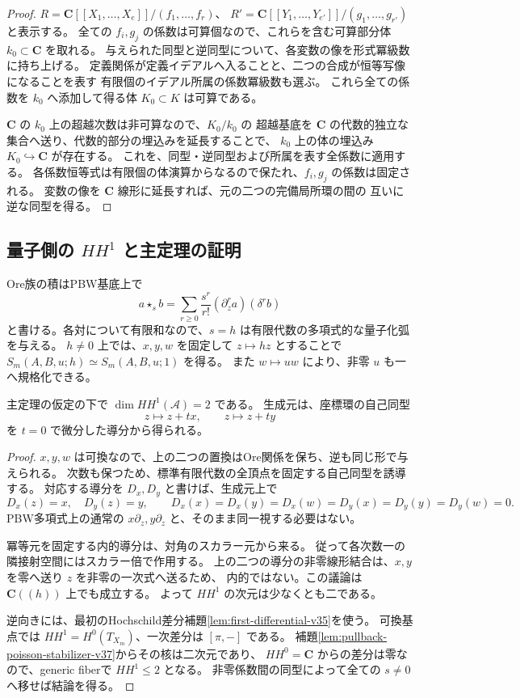 \begin{proof}
$R=\mathbf C[[X_1,\ldots,X_e]]/(f_1,\ldots,f_r)$、
$R'=\mathbf C[[Y_1,\ldots,Y_{e'}]]/(g_1,\ldots,g_{r'})$ と表示する。
全ての $f_i,g_j$ の係数は可算個なので、これらを含む可算部分体
$k_0\subset\mathbf C$ を取れる。
与えられた同型と逆同型について、各変数の像を形式冪級数に持ち上げる。
定義関係が定義イデアルへ入ることと、二つの合成が恒等写像になることを表す
有限個のイデアル所属の係数冪級数も選ぶ。
これら全ての係数を $k_0$ へ添加して得る体 $K_0\subset K$ は可算である。

$\mathbf C$ の $k_0$ 上の超越次数は非可算なので、$K_0/k_0$ の
超越基底を $\mathbf C$ の代数的独立な集合へ送り、代数的部分の埋込みを延長することで、
$k_0$ 上の体の埋込み $K_0\hookrightarrow\mathbf C$ が存在する。
これを、同型・逆同型および所属を表す全係数に適用する。
各係数恒等式は有限個の体演算からなるので保たれ、$f_i,g_j$ の係数は固定される。
変数の像を $\mathbf C$ 線形に延長すれば、元の二つの完備局所環の間の
互いに逆な同型を得る。
\end{proof}

\subsection{量子側の $HH^1$ と主定理の証明}

Ore族の積はPBW基底上で
\[
 a\star_s b=\sum_{r\ge0}\frac{s^r}{r!}
                  (\partial_z^r a)(\delta^r b)
\]
と書ける。各対について有限和なので、$s=h$ は有限代数の多項式的な量子化弧を与える。
$h\ne0$ 上では、$x,y,w$ を固定して $z\mapsto hz$ とすることで
$S_m(A,B,u;h)\simeq S_m(A,B,u;1)$ を得る。
また $w\mapsto uw$ により、非零 $u$ も一へ規格化できる。

\begin{lemma}[量子側の二つの外的導分]
\label{lem:pullback-quantum-HH1-v37}
主定理の仮定の下で $\dim HH^1(\mathcal A)=2$ である。
生成元は、座標環の自己同型
\[
 z\longmapsto z+tx,\qquad z\longmapsto z+ty
\]
を $t=0$ で微分した導分から得られる。
\end{lemma}

\begin{proof}
$x,y,w$ は可換なので、上の二つの置換はOre関係を保ち、逆も同じ形で与えられる。
次数も保つため、標準有限代数の全頂点を固定する自己同型を誘導する。
対応する導分を $D_x,D_y$ と書けば、生成元上で
\[
 D_x(z)=x,\quad D_y(z)=y,\qquad
 D_x(x)=D_x(y)=D_x(w)=D_y(x)=D_y(y)=D_y(w)=0.
\]
PBW多項式上の通常の $x\partial_z,y\partial_z$ と、そのまま同一視する必要はない。

冪等元を固定する内的導分は、対角のスカラー元から来る。
従って各次数一の隣接射空間にはスカラー倍で作用する。
上の二つの導分の非零線形結合は、$x,y$ を零へ送り $z$ を非零の一次式へ送るため、
内的ではない。この議論は $\mathbf C((h))$ 上でも成立する。
よって $HH^1$ の次元は少なくとも二である。

逆向きには、最初のHochschild差分補題\ref{lem:first-differential-v35}を使う。
可換基点では $HH^1=H^0(T_{X_m})$、一次差分は $[\pi,-]$ である。
補題\ref{lem:pullback-poisson-stabilizer-v37}からその核は二次元であり、
$HH^0=\mathbf C$ からの差分は零なので、generic fiberで $HH^1\le2$ となる。
非零係数間の同型によって全ての $s\ne0$ へ移せば結論を得る。
\end{proof}

